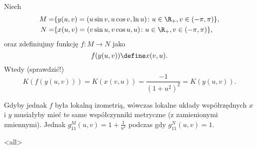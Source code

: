 \begin{frame}

\begin{przyklad}
Niech 
\begin{align*}
M=&\{y(u,v)=(u \sin v, u\cos v,\ln u)\colon u\in \R_+, v\in (-\pi,\pi)\},\\
N=&\{x(u,v)=(v \sin u, v\cos u, u)\colon u\in \R_+, v\in (-\pi,\pi)\},
\end{align*}
oraz zdefiniujmy funkcję $f\colon M\to N$ jako \[f(y(u,v))\define x(v,u).\]
\pause Wtedy (sprawdzić!)\[K\left( f(y(u,v))\right)=K(x(v,u))=\frac{-1}{(1+u^2)^2}=K(y(u,v)).\]

\pause Gdyby jednak $f$ była lokalną izometrią, wówczas lokalne układy współrzędnych $x$ i $y$ musiałyby mieć te same współczynniki metryczne (z zamienionymi zmiennymi). Jednak $g^M_{11}(u,v)=1+\frac{1}{u^2}$ podczas gdy $g^N_{11}(u,v)=1$.
\end{przyklad}


\end{frame}
\mode<all>{}

